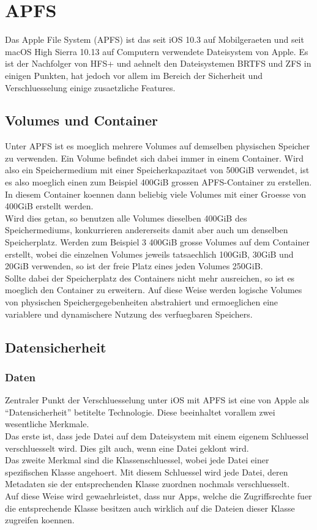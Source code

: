 \section{APFS}
Das Apple File System (APFS) ist das seit iOS 10.3 auf Mobilgeraeten und seit macOS High Sierra 10.13 auf Computern verwendete Dateisystem von Apple. Es ist der Nachfolger von HFS+ und aehnelt den Dateisystemen BRTFS und ZFS in einigen Punkten, hat jedoch vor allem im Bereich der Sicherheit und Verschluesselung einige zusaetzliche Features.

\subsection{Volumes und Container}
Unter APFS ist es moeglich mehrere Volumes auf demselben physischen Speicher zu verwenden. Ein Volume befindet sich dabei immer in einem Container. Wird also ein Speichermedium mit einer Speicherkapazitaet von 500GiB verwendet, ist es also moeglich einen zum Beispiel 400GiB grossen APFS-Container zu erstellen. In diesem Container koennen dann beliebig viele Volumes mit einer Groesse von 400GiB erstellt werden.\\
Wird dies getan, so benutzen alle Volumes dieselben 400GiB des Speichermediums, konkurrieren andererseits damit aber auch um denselben Speicherplatz. Werden zum Beispiel 3 400GiB grosse Volumes auf dem Container erstellt, wobei die einzelnen Volumes jeweils tatsaechlich 100GiB, 30GiB und 20GiB verwenden, so ist der freie Platz eines jeden Volumes 250GiB.\\
Sollte dabei der Speicherplatz des Containers nicht mehr ausreichen, so ist es moeglich den Container zu erweitern. Auf diese Weise werden logische Volumes von physischen Speichergegebenheiten abstrahiert und ermoeglichen eine variablere und dynamischere Nutzung des verfuegbaren Speichers.
\subsection{Datensicherheit}

\subsubsection{Daten}
Zentraler Punkt der Verschluesselung unter iOS mit APFS ist eine von Apple als “Datensicherheit” betitelte Technologie. Diese beeinhaltet vorallem zwei wesentliche Merkmale.\\
Das erste ist, dass jede Datei auf dem Dateisystem mit einem eigenem Schluessel verschluesselt wird. Dies gilt auch, wenn eine Datei geklont wird.\\
Das zweite Merkmal sind die Klassenschluessel, wobei jede Datei einer spezifischen Klasse angehoert. Mit diesem Schluessel wird jede Datei, deren Metadaten sie der entsprechenden Klasse zuordnen nochmals verschluesselt.\\
Auf diese Weise wird gewaehrleistet, dass nur Apps, welche die Zugriffsrechte fuer die entsprechende Klasse besitzen auch wirklich auf die Dateien dieser Klasse zugreifen koennen.


